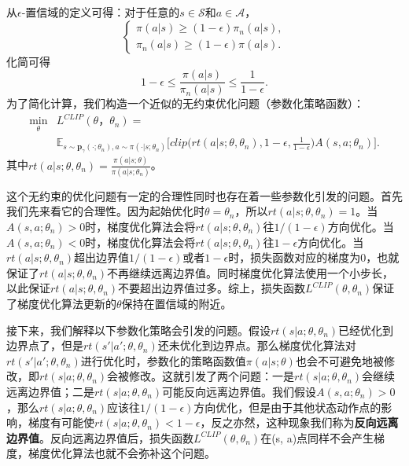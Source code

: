 从$\epsilon$-置信域的定义可得：对于任意的$s\in\mathcal{S}$和$a\in\mathcal{A}$，
\begin{equation}
    \begin{cases}
        \pi(a\vert s) \ge (1 - \epsilon) \pi_n(a \vert s),\\
        \pi_n(a \vert s) \ge (1 - \epsilon) \pi(a \vert s).
    \end{cases}
\end{equation}
化简可得
\begin{equation}
    1 - \epsilon \le \frac{\pi(a \vert s)}{\pi_n(a \vert s)} \le \frac{1}{1 - \epsilon}.
\end{equation}
为了简化计算，我们构造一个近似的无约束优化问题（参数化策略函数）：
\begin{equation}\label{equ:ppo-clip-loss}
    \begin{aligned}
    \min_{\theta} &L^{CLIP}(\theta，\theta_n) = \\ 
    &\mathbb{E}_{s \sim \mathbf{p}_{\gamma}(\cdot; \theta_n), a \sim \pi(\cdot \vert s; \theta_n)}
    \bigg[
        clip\bigg(rt(a \vert s; \theta, \theta_n), 1 - \epsilon, \frac{1}{1 - \epsilon}
        \bigg) A(s, a; \theta_n)
    \bigg].
    \end{aligned}
\end{equation}
其中$rt(a \vert s; \theta, \theta_n) = \frac{\pi(a \vert s; \theta)}{\pi(a \vert s; \theta_n)}$。

这个无约束的优化问题有一定的合理性同时也存在着一些参数化引发的问题。首先我们先来看它的合理性。因为起始优化时$\theta = \theta_n$，所以$rt(a \vert s; \theta, \theta_n)=1$。当$A(s, a; \theta_n) > 0$时，梯度优化算法会将$rt(a \vert s; \theta, \theta_n)$往$1/(1 - \epsilon)$方向优化。当$A(s, a; \theta_n) < 0$时，梯度优化算法会将$rt(a \vert s; \theta, \theta_n)$往$1 - \epsilon$方向优化。当$rt(a \vert s; \theta, \theta_n)$超出边界值$1/(1 - \epsilon)$或者$1 - \epsilon$时，损失函数对应的梯度为0，也就保证了$rt(a \vert s; \theta,\theta_n)$不再继续远离边界值。同时梯度优化算法使用一个小步长，以此保证$rt(a \vert s; \theta, \theta_n)$不要超出边界值过多。综上，损失函数$L^{CLIP}(\theta, \theta_n)$保证了梯度优化算法更新的$\theta$保持在置信域的附近。

接下来，我们解释以下参数化策略会引发的问题。假设$rt(s\vert a; \theta, \theta_n)$已经优化到边界点了，但是$rt(s'\vert a'; \theta, \theta_n)$还未优化到边界点。那么梯度优化算法对$rt(s'\vert a';\theta, \theta_n)$进行优化时，参数化的策略函数值$\pi(a \vert s; \theta)$也会不可避免地被修改，即$rt(s\vert a; \theta, \theta_n)$会被修改。这就引发了两个问题：一是$rt(s\vert a; \theta, \theta_n)$会继续远离边界值；二是$rt(s\vert a; \theta, \theta_n)$可能反向远离边界值。我们假设$A(s, a; \theta_n) > 0$，那么$rt(s\vert a; \theta, \theta_n)$应该往$1/(1 - \epsilon)$方向优化，但是由于其他状态动作点的影响，梯度有可能使$rt(s\vert a; \theta, \theta_n) < 1 - \epsilon$，反之亦然，这种现象我们称为\textbf{反向远离边界值}。反向远离边界值后，损失函数$L^{CLIP}(\theta, \theta_n)$在(s, a)点同样不会产生梯度，梯度优化算法也就不会弥补这个问题。

